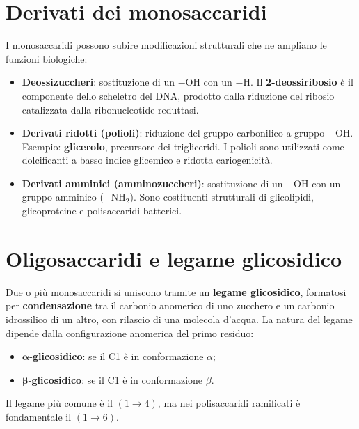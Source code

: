 \documentclass[12pt,a4paper]{report}
\begin{document}
\section{Derivati dei monosaccaridi}
I monosaccaridi possono subire modificazioni strutturali che ne ampliano le funzioni biologiche:
\begin{itemize}
\item \textbf{Deossizuccheri}: sostituzione di un \(-\mathrm{OH}\) con un \(-\mathrm{H}\). Il \textbf{2-deossiribosio} è il componente dello scheletro del DNA, prodotto dalla riduzione del ribosio catalizzata dalla ribonucleotide reduttasi.
\item \textbf{Derivati ridotti (polioli)}: riduzione del gruppo carbonilico a gruppo \(-\mathrm{OH}\). Esempio: \textbf{glicerolo}, precursore dei trigliceridi. I polioli sono utilizzati come dolcificanti a basso indice glicemico e ridotta cariogenicità.
\item \textbf{Derivati amminici (amminozuccheri)}: sostituzione di un \(-\mathrm{OH}\) con un gruppo amminico (\(-\mathrm{NH_2}\)). Sono costituenti strutturali di glicolipidi, glicoproteine e polisaccaridi batterici.
\end{itemize}

\section{Oligosaccaridi e legame glicosidico}
Due o più monosaccaridi si uniscono tramite un \textbf{legame glicosidico}, formatosi per \textbf{condensazione} tra il carbonio anomerico di uno zucchero e un carbonio idrossilico di un altro, con rilascio di una molecola d'acqua. La natura del legame dipende dalla configurazione anomerica del primo residuo:
\begin{itemize}
\item \(\boldsymbol{\alpha}\)-\textbf{glicosidico}: se il C1 è in conformazione \(\alpha\);
\item \(\boldsymbol{\beta}\)-\textbf{glicosidico}: se il C1 è in conformazione \(\beta\).
\end{itemize}
Il legame più comune è il \((1\to4)\), ma nei polisaccaridi ramificati è fondamentale il \((1\to6)\).
\end{document}
